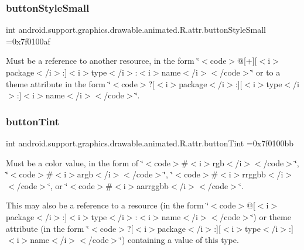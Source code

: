 \subsubsection{\texorpdfstring{button\+Style\+Small}{buttonStyleSmall}}
{\footnotesize\ttfamily int android.\+support.\+graphics.\+drawable.\+animated.\+R.\+attr.\+button\+Style\+Small =0x7f0100af\hspace{0.3cm}{\ttfamily [static]}}

Must be a reference to another resource, in the form \char`\"{}$<$code$>$@\mbox{[}+\mbox{]}\mbox{[}$<$i$>$package$<$/i$>$\+:\mbox{]}$<$i$>$type$<$/i$>$\+:$<$i$>$name$<$/i$>$$<$/code$>$\char`\"{} or to a theme attribute in the form \char`\"{}$<$code$>$?\mbox{[}$<$i$>$package$<$/i$>$\+:\mbox{]}\mbox{[}$<$i$>$type$<$/i$>$\+:\mbox{]}$<$i$>$name$<$/i$>$$<$/code$>$\char`\"{}. \mbox{\label{classandroid_1_1support_1_1graphics_1_1drawable_1_1animated_1_1R_1_1attr_a58e86b6d836adfadc10101909043e2ea}} 
\subsubsection{\texorpdfstring{button\+Tint}{buttonTint}}
{\footnotesize\ttfamily int android.\+support.\+graphics.\+drawable.\+animated.\+R.\+attr.\+button\+Tint =0x7f0100bb\hspace{0.3cm}{\ttfamily [static]}}

Must be a color value, in the form of \char`\"{}$<$code$>$\#$<$i$>$rgb$<$/i$>$$<$/code$>$\char`\"{}, \char`\"{}$<$code$>$\#$<$i$>$argb$<$/i$>$$<$/code$>$\char`\"{}, \char`\"{}$<$code$>$\#$<$i$>$rrggbb$<$/i$>$$<$/code$>$\char`\"{}, or \char`\"{}$<$code$>$\#$<$i$>$aarrggbb$<$/i$>$$<$/code$>$\char`\"{}. 

This may also be a reference to a resource (in the form \char`\"{}$<$code$>$@\mbox{[}$<$i$>$package$<$/i$>$\+:\mbox{]}$<$i$>$type$<$/i$>$\+:$<$i$>$name$<$/i$>$$<$/code$>$\char`\"{}) or theme attribute (in the form \char`\"{}$<$code$>$?\mbox{[}$<$i$>$package$<$/i$>$\+:\mbox{]}\mbox{[}$<$i$>$type$<$/i$>$\+:\mbox{]}$<$i$>$name$<$/i$>$$<$/code$>$\char`\"{}) containing a value of this type. \mbox{\label{classandroid_1_1support_1_1graphics_1_1drawable_1_1animated_1_1R_1_1attr_a5351d5e8e9287a0094f6bbbc9b1f6d81}} 
